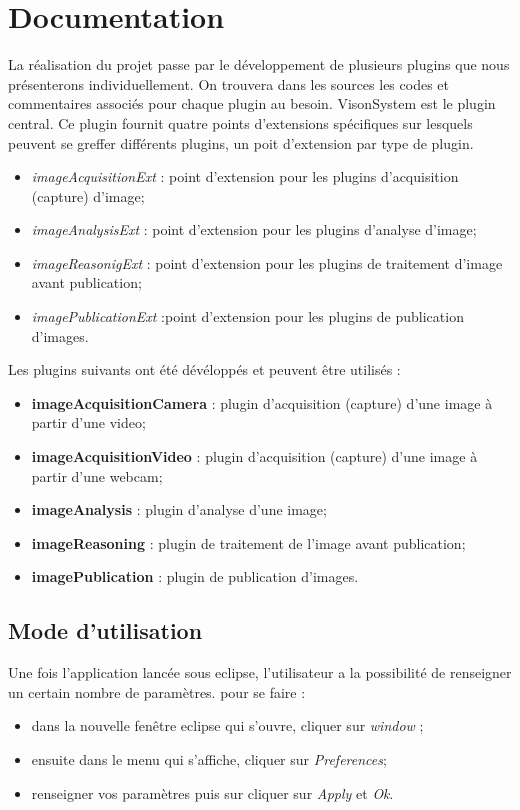 \documentclass[a4paper , 12pt]{article}
\begin{document}
\section{Documentation}
La réalisation du projet passe par le développement de plusieurs plugins que nous présenterons individuellement. On trouvera dans les sources les codes et commentaires associés pour chaque plugin au besoin.
VisonSystem est le plugin central. Ce plugin fournit quatre points d'extensions spécifiques sur lesquels peuvent se greffer différents plugins, un poit d'extension par type de plugin.
\begin{itemize}
	\item {\it imageAcquisitionExt} : point d'extension pour les plugins d'acquisition (capture) d'image; 
	\item {\it imageAnalysisExt} : point d'extension pour les plugins d'analyse d'image;
	\item {\it imageReasonigExt} : point d'extension pour les plugins de traitement d'image avant publication; 
	\item {\it imagePublicationExt} :point d'extension pour les plugins de publication d'images.
\end{itemize}  
Les plugins suivants ont été dévéloppés et peuvent être utilisés : 
\begin{itemize}
	\item {\bf imageAcquisitionCamera} : plugin d'acquisition (capture) d'une image à partir d'une video; 
	\item {\bf imageAcquisitionVideo} :  plugin d'acquisition (capture) d'une image à partir d'une webcam;
	\item {\bf imageAnalysis} : plugin d'analyse d'une image; 
	\item {\bf imageReasoning} : plugin de traitement de l'image avant publication;
	\item {\bf imagePublication} : plugin de publication d'images.
\end{itemize}  

\subsection{Mode d'utilisation}
Une fois l'application lancée sous eclipse, l'utilisateur a la possibilité de renseigner un certain nombre de paramètres. pour se faire : 
\begin{itemize}[label=\textbullet,font=\color{red}]
	\item dans la nouvelle fenêtre eclipse qui s'ouvre, cliquer sur {\it window} ; 
	\item ensuite dans le menu qui s'affiche, cliquer sur {\it Preferences};
	\item renseigner vos paramètres puis sur cliquer sur {\it Apply} et {\it Ok}.
\end{itemize}
\end{document}
